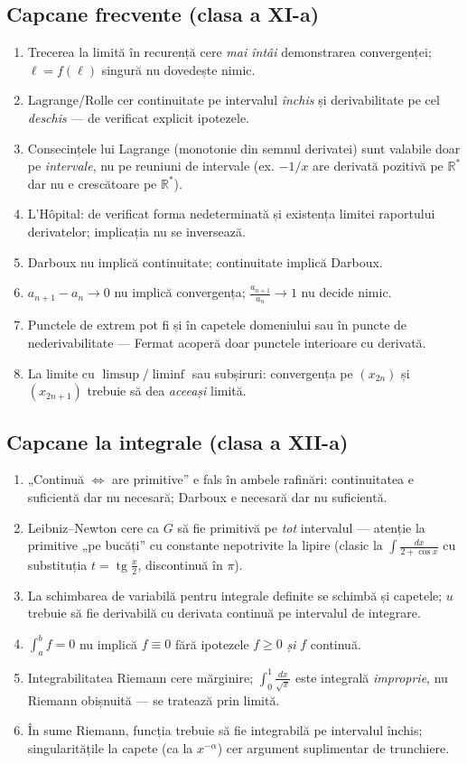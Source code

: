 \subsection{Capcane frecvente (clasa a XI-a)}
\begin{enumerate}[leftmargin=*, itemsep=2pt]
\item Trecerea la limită în recurență cere \emph{mai întâi} demonstrarea convergenței; $\ell=f(\ell)$ singură nu dovedește nimic.
\item Lagrange/Rolle cer continuitate pe intervalul \emph{închis} și derivabilitate pe cel \emph{deschis} --- de verificat explicit ipotezele.
\item Consecințele lui Lagrange (monotonie din semnul derivatei) sunt valabile doar pe \emph{intervale}, nu pe reuniuni de intervale (ex. $-1/x$ are derivată pozitivă pe $\mathbb{R}^*$ dar nu e crescătoare pe $\mathbb{R}^*$).
\item L'Hôpital: de verificat forma nedeterminată și existența limitei raportului derivatelor; implicația nu se inversează.
\item Darboux nu implică continuitate; continuitate implică Darboux.
\item $a_{n+1}-a_n\to 0$ nu implică convergența; $\frac{a_{n+1}}{a_n}\to 1$ nu decide nimic.
\item Punctele de extrem pot fi și în capetele domeniului sau în puncte de nederivabilitate --- Fermat acoperă doar punctele interioare cu derivată.
\item La limite cu $\limsup/\liminf$ sau subșiruri: convergența pe $(x_{2n})$ și $(x_{2n+1})$ trebuie să dea \emph{aceeași} limită.
\end{enumerate}

\subsection{Capcane la integrale (clasa a XII-a)}
\begin{enumerate}[leftmargin=*, itemsep=2pt]
\item „Continuă $\iff$ are primitive'' e fals în ambele rafinări: continuitatea e suficientă dar nu necesară; Darboux e necesară dar nu suficientă.
\item Leibniz--Newton cere ca $G$ să fie primitivă pe \emph{tot} intervalul --- atenție la primitive „pe bucăți'' cu constante nepotrivite la lipire (clasic la $\int\frac{dx}{2+\cos x}$ cu substituția $t=\operatorname{tg}\frac x2$, discontinuă în $\pi$).
\item La schimbarea de variabilă pentru integrale definite se schimbă și capetele; $u$ trebuie să fie derivabilă cu derivata continuă pe intervalul de integrare.
\item $\int_a^b f=0$ nu implică $f\equiv0$ fără ipotezele $f\ge0$ \emph{și} $f$ continuă.
\item Integrabilitatea Riemann cere mărginire; $\int_0^1\frac{dx}{\sqrt x}$ este integrală \emph{improprie}, nu Riemann obișnuită --- se tratează prin limită.
\item În sume Riemann, funcția trebuie să fie integrabilă pe intervalul închis; singularitățile la capete (ca la $x^{-\alpha}$) cer argument suplimentar de trunchiere.
\end{enumerate}

